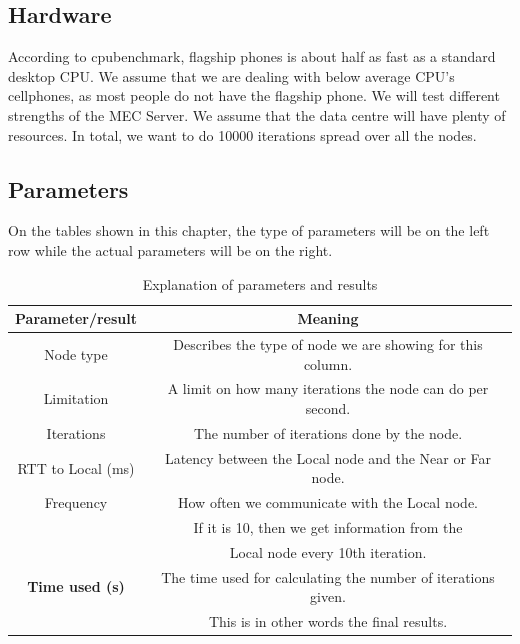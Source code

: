 \subsection{Hardware}
According to cpubenchmark\cite{noauthor_passmark_nodate}, flagship phones is about half as fast as a standard desktop CPU. We assume that we are dealing with below average CPU's cellphones, as most people do not have the flagship phone. We will test different strengths of the MEC Server. We assume that the data centre will have plenty of resources. In total, we want to do 10000 iterations spread over all the nodes.


\subsection{Parameters}
On the tables shown in this chapter, the type of parameters will be on the left row while the actual parameters will be on the right.

\begin{table}[h!]
    \centering
    \begin{tabular}{|c|c|}
        \hline
        Parameter/\textbf{result} &  Meaning\\
        \hline
        \hline
        Node type & Describes the type of node we are showing for this column. \\
        \hline
        Limitation & A limit on how many iterations the node can do per second. \\
        \hline
        Iterations & The number of iterations done by the node. \\
        \hline
        RTT to Local (ms) & Latency between the Local node and the Near or Far node. \\
        \hline
        Frequency & How often we communicate with the Local node. \\
                 & If it is 10, then we get information from the \\
                 & Local node every 10th iteration. \\
        \hline
        \textbf{Time used (s)} & The time used for calculating the number of iterations given. \\
                                & This is in other words the final results. \\
        \hline
    \end{tabular}
    \caption{Explanation of parameters and results}
    \label{tab:parameter_explanation}
\end{table}

